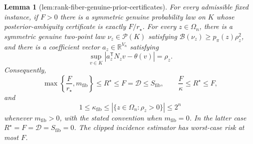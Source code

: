 \documentclass{article}
\newtheorem{lemma}{Lemma}
\begin{document}
\begin{lemma}[lem:rank-fiber-genuine-prior-certificates]\label{lem:rank-fiber-genuine-prior-certificates}
For every admissible fixed instance, if \(F>0\) there is a symmetric genuine probability law on \(K\) whose posterior-ambiguity certificate is exactly \(F/r_{\star}\). For every \(z\in\Omega_n\), there is a symmetric genuine two-point law \(\nu_z\in\mathcal P(K)\) satisfying \(\mathcal B(\nu_z)\ge p_{\pi}(z)\rho_z^2\), and there is a coefficient vector \(a_z\in\mathbb R^{V_n}\) satisfying
\[
 \sup_{v\in K}\left\lvert a_z^{\mathsf T}N_zv-\theta(v)\right\rvert=\rho_z.
\]
Consequently,
\[
 \max\left\{\frac{F}{r_{\star}},m_{\mathrm{fib}}\right\}
 \le R^{\star}\le F=\mathcal D\le S_{\mathrm{fib}},
 \qquad
 \frac{F}{\kappa}\le R^{\star}\le F,
\]
and
\[
 1\le\kappa_{\mathrm{fib}}
 \le\left\lvert\{z\in\Omega_n:\rho_z>0\}\right\rvert
 \le 2^n
\]
whenever \(m_{\mathrm{fib}}>0\), with the stated convention when \(m_{\mathrm{fib}}=0\). In the latter case \(R^{\star}=F=\mathcal D=S_{\mathrm{fib}}=0\). The clipped incidence estimator has worst-case risk at most \(F\).
\end{lemma}
\end{document}
